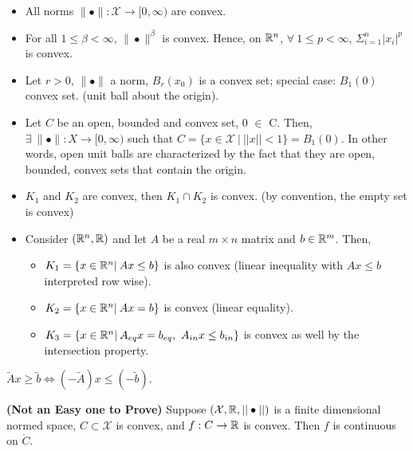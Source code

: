 \begin{fact}\mbox{ }
\begin{itemize}
        \item All norms $\| \bullet \|:\mathcal{X} \to [0, \infty)$ are convex.
        
        \item For all $1\leq\beta<\infty$, $\| \bullet \|^\beta$ is convex. Hence, on $\mathbb R^n$, $\forall~ 1 \le p < \infty$, $ \Sigma_{i=1}^{n}|x_i|^p$            is convex.
        \item Let $r>0$, $\| \bullet \|$ a norm, $B_r(x_0)$ is a convex set; special case: $B_1(0)$ convex set. (unit ball about the origin).
        \item Let $C$ be an open, bounded and convex set, 0 $\in$ C. Then, $\exists\ \| \bullet \|: X \to [0,\infty)$ such that $C=\{x\in \mathcal{X}\ |\:||x||<1\} = B_1(0)$. In other words, open unit balls are characterized by the fact that they are open, bounded, convex sets that contain the origin. 
        \item $K_1$ and $K_2$ are convex, then $K_1 \cap K_2$ is convex. (by convention, the empty set is convex)
        \item Consider $(\mathbb R^n, \mathbb R)$ and let $A$ be a real $m \times n$ matrix and $b\in \mathbb R^m$. Then,
        \begin{itemize}
            \item $K_1=\{x \in \mathbb R^n|\:Ax\leq b\}$ is also convex (linear inequality with $Ax\leq b$ interpreted row wise).
            \item $K_2=\{x \in \mathbb R^n|\:Ax=b\}$ is convex (linear equality).
            \item $K_3=\{x \in \real^n|\:A_{eq}x=b_{eq},\ A_{in}x\leq b_{in}\}$ is convex as well by the intersection property.
        \end{itemize}
    \end{itemize}

\end{fact}
    

\begin{rem} $\widetilde{A}x \geq \widetilde{b} \iff (-\widetilde{A})x \leq (-\widetilde{b})$.

\end{rem}


\begin{fact} \textbf{(Not an Easy one to Prove)} Suppose $(\mathcal{X},\mathbb R,||  \bullet ||)$ is a finite dimensional normed space, $C\subset \mathcal{X}$ is convex, and $f:C\to \mathbb R$ is convex. Then $f$ is continuous on $\mathring C$.
\end{fact}   

